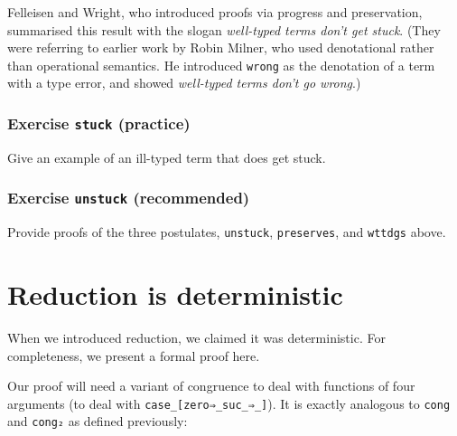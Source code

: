 Felleisen and Wright, who introduced proofs via progress and
preservation, summarised this result with the slogan \emph{well-typed
terms don't get stuck}. (They were referring to earlier work by Robin
Milner, who used denotational rather than operational semantics. He
introduced \texttt{wrong} as the denotation of a term with a type error,
and showed \emph{well-typed terms don't go wrong}.)

\hypertarget{exercise-stuck-practice}{%
\subsubsection{\texorpdfstring{Exercise \texttt{stuck}
(practice)}{Exercise stuck (practice)}}\label{exercise-stuck-practice}}

Give an example of an ill-typed term that does get stuck.

\begin{fence}
\begin{code}%
\>[0]\<%
\end{code}
\end{fence}

\hypertarget{exercise-unstuck-recommended}{%
\subsubsection{\texorpdfstring{Exercise \texttt{unstuck}
(recommended)}{Exercise unstuck (recommended)}}\label{exercise-unstuck-recommended}}

Provide proofs of the three postulates, \texttt{unstuck},
\texttt{preserves}, and \texttt{wttdgs} above.

\begin{fence}
\begin{code}%
\>[0]\<%
\end{code}
\end{fence}

\hypertarget{reduction-is-deterministic}{%
\section{Reduction is deterministic}\label{reduction-is-deterministic}}

When we introduced reduction, we claimed it was deterministic. For
completeness, we present a formal proof here.

Our proof will need a variant of congruence to deal with functions of
four arguments (to deal with
\texttt{case\_{[}zero⇒\_\textbar{}suc\_⇒\_{]}}). It is exactly analogous
to \texttt{cong} and \texttt{cong₂} as defined previously:

